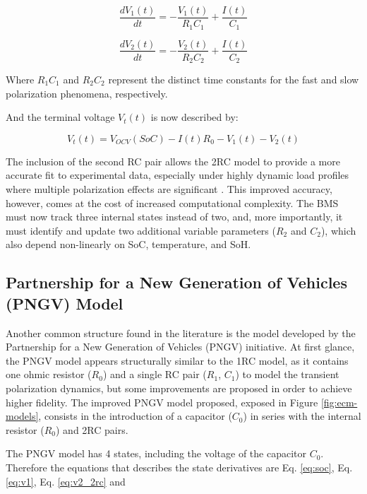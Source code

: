 \documentclass[lettersize,journal]{IEEEtran}
\begin{document}
\begin{equation}
	\label{eq:v1_2rc}
	\frac{dV_1(t)}{dt} = - \frac{V_1(t)}{R_1 C_1} + \frac{I(t)}{C_1}
\end{equation}

\begin{equation}
	\label{eq:v2_2rc}
	\frac{dV_2(t)}{dt} = - \frac{V_2(t)}{R_2 C_2} + \frac{I(t)}{C_2}
\end{equation}

Where $R_1 C_1$ and $R_2 C_2$ represent the distinct time constants for the fast and slow polarization phenomena, respectively.

And the terminal voltage $V_t(t)$ is now described by:

\begin{equation}
	\label{eq:vt_2rc}
	V_t(t) = V_{OCV}(SoC) - I(t)R_0 - V_1(t) - V_2(t)
\end{equation}

The inclusion of the second RC pair allows the 2RC model to provide a more accurate fit to experimental data, especially under highly dynamic load profiles where multiple polarization effects are significant \cite{khalfi2021electric}. This improved accuracy, however, comes at the cost of increased computational complexity. The BMS must now track three internal states instead of two, and, more importantly, it must identify and update two additional variable parameters ($R_2$ and $C_2$), which also depend non-linearly on SoC, temperature, and SoH.

\subsection{Partnership for a New Generation of Vehicles (PNGV) Model}

Another common structure found in the literature is the model developed by the Partnership for a New Generation of Vehicles (PNGV) initiative\cite{tekin2024comparative}. At first glance, the PNGV model appears structurally similar to the 1RC model, as it contains one ohmic resistor ($R_0$) and a single RC pair ($R_1$, $C_1$) to model the transient polarization dynamics, but some improvements are proposed in order to achieve higher fidelity\cite{Tao2023,Xinyu2025}. The improved PNGV model proposed, exposed in Figure \ref{fig:ecm-models}, consists in the introduction of a capacitor ($C_0$) in series with the internal resistor ($R_0$) and 2RC pairs. 

The PNGV model has 4 states, including the voltage of the capacitor $C_0$. Therefore the equations that describes the state derivatives are Eq. \ref{eq:soc}, Eq. \ref{eq:v1}, Eq. \ref{eq:v2_2rc} and
\end{document}
